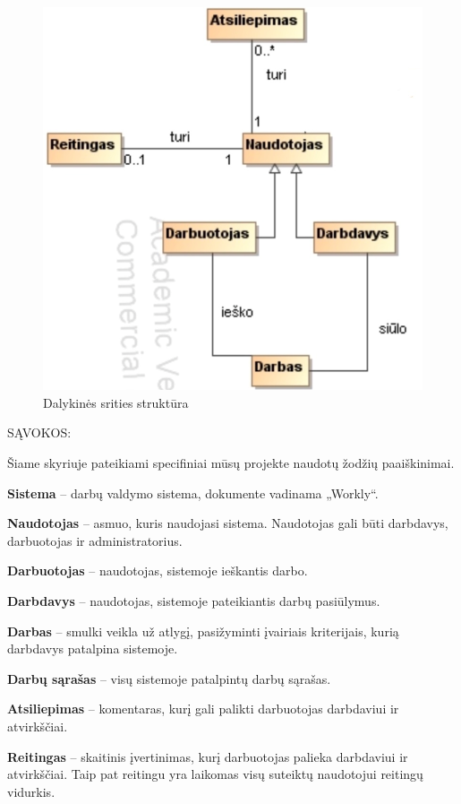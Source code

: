 \documentclass{VUMIFPSkursinis}
\begin{document}
\begin{figure}[H]
\centering
\includegraphics[scale=0.5]{img/va1.png}
\caption{Dalykinės srities struktūra}
\end{figure}

SĄVOKOS:

Šiame skyriuje pateikiami specifiniai mūsų projekte naudotų žodžių paaiškinimai.

\textbf{Sistema} – darbų valdymo sistema, dokumente vadinama „Workly“.

\textbf{Naudotojas} – asmuo, kuris naudojasi sistema. Naudotojas gali būti darbdavys, darbuotojas ir administratorius.

\textbf{Darbuotojas} – naudotojas, sistemoje ieškantis darbo.

\textbf{Darbdavys} – naudotojas, sistemoje pateikiantis darbų pasiūlymus.

\textbf{Darbas} – smulki veikla už atlygį, pasižyminti įvairiais kriterijais, kurią darbdavys patalpina sistemoje.

\textbf{Darbų sąrašas }– visų sistemoje patalpintų darbų sąrašas.

\textbf{Atsiliepimas} – komentaras, kurį gali palikti darbuotojas darbdaviui ir atvirkščiai.

\textbf{Reitingas} – skaitinis įvertinimas, kurį darbuotojas palieka darbdaviui ir atvirkščiai. Taip pat reitingu yra laikomas visų suteiktų naudotojui reitingų vidurkis.
\end{document}
